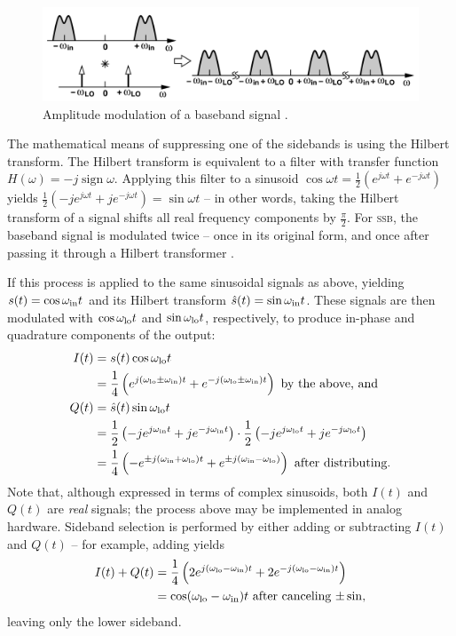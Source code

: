 \documentclass[12pt]{article}
\newcommand{\ssb}{\textsc{ssb}\xspace}
\DeclareMathOperator{\sign}{sign}
\begin{document}
\begin{figure}[h]
	\centering
	\includegraphics[width=.9\textwidth]{razavi-am.png}
	\caption{Amplitude modulation of a baseband signal
	\autocite{rf-microelectronics}.}
	\label{fig:razavi-am}
\end{figure}

The mathematical means of suppressing one of the sidebands is using the Hilbert
transform. The Hilbert transform is equivalent to a filter with transfer
function \(H(\omega) = -j \sign \omega\). Applying this filter to a  sinusoid
\(\cos \omega t = \frac 1 2 (e^{j \omega t} + e^{-j \omega t})\) yields \(\frac
1 2 (-j e^{j \omega t} + j e^{-j \omega t}) = \sin \omega t\) -- in other
words, taking the Hilbert transform of a signal shifts all real frequency
components by \(\frac \pi 2\). For \ssb, the baseband signal is modulated twice
-- once in its original form, and once after passing it through a Hilbert
transformer \autocite{ssb-tretter}.

If this process is applied to the same sinusoidal signals as above, yielding
\(s(t) = \cos \omega_\text{in} t \) and its Hilbert transform \(\hat s(t) = \sin \omega_\text{in} t\).
These signals are then modulated with \(\cos \omega_\text{lo} t\) and \(\sin \omega_\text{lo} t\),
respectively, to produce in-phase and quadrature components of the output:
\begin{align*}
	I(t) &= s(t) \cos \omega_\text{lo} t \\
		&= \frac 1 4 \left(
			e^{j (\omega_\text{lo} \pm \omega_\text{in}) t} + e^{-j (\omega_\text{lo} \pm \omega_\text{in}) t}
		\right) \text{ by the above, and} \\
	Q(t) &= \hat s(t) \sin \omega_\text{lo} t \\
		&= \frac 1 2 \left(-j e^{j \omega_\text{in} t} + j e^{-j \omega_\text{in} t}\right)
			\cdot \frac 1 2 \left(
				-j e^{j \omega_\text{lo} t} + j e^{-j \omega_\text{lo} t}\right
			) \\
		&= \frac 1 4 \left(
			-e^{\pm j (\omega_\text{in} + \omega_\text{lo}) t} + e^{\pm j (\omega_\text{in} - \omega_\text{lo})}
		\right) \text { after distributing.}
\end{align*}
Note that, although expressed in terms of complex sinusoids, both \(I(t)\) and
\(Q(t)\) are \emph{real} signals; the process above may be implemented in
analog hardware. Sideband selection is performed by either adding or
subtracting \(I(t)\) and \(Q(t)\) -- for example, adding yields
\begin{align*}
	I(t) + Q(t) &= \frac 1 4 \left(
		2 e^{j (\omega_\text{lo} - \omega_\text{in}) t} + 2 e^{-j (\omega_\text{lo} - \omega_\text{in}) t}
	\right) \\
	&= \cos (\omega_\text{lo} - \omega_\text{in}) t \text{ after canceling \(\pm \sin\),}
\end{align*}
leaving only the lower sideband.
\end{document}
